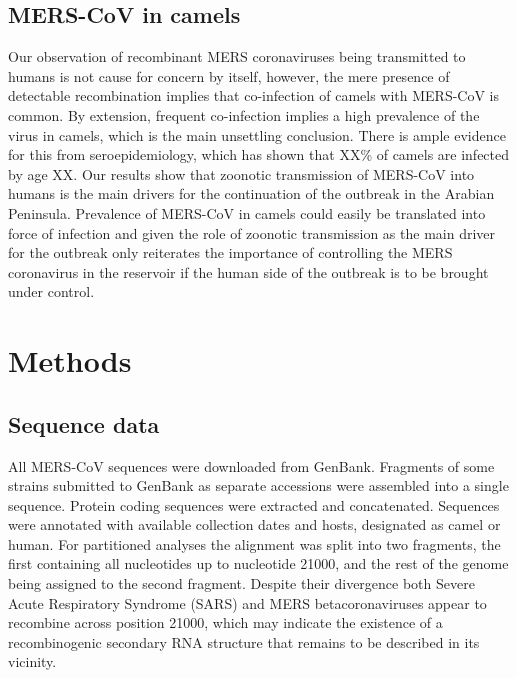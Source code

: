 \documentclass[11pt,oneside,letterpaper]{article}
\begin{document}
\subsection*{MERS-CoV in camels}
Our observation of recombinant MERS coronaviruses being transmitted to humans is not cause for concern by itself, however, the mere presence of detectable recombination implies that co-infection of camels with MERS-CoV is common.
By extension, frequent co-infection implies a high prevalence of the virus in camels, which is the main unsettling conclusion.
There is ample evidence for this from seroepidemiology, which has shown that XX\% of camels are infected by age XX.
Our results show that zoonotic transmission of MERS-CoV into humans is the main drivers for the continuation of the outbreak in the Arabian Peninsula. 
Prevalence of MERS-CoV in camels could easily be translated into force of infection and given the role of zoonotic transmission as the main driver for the outbreak only reiterates the importance of controlling the MERS coronavirus in the reservoir if the human side of the outbreak is to be brought under control.



\newpage

\section*{Methods}
\subsection*{Sequence data}
All MERS-CoV sequences were downloaded from GenBank.
Fragments of some strains submitted to GenBank as separate accessions were assembled into a single sequence.
Protein coding sequences were extracted and concatenated.
Sequences were annotated with available collection dates and hosts, designated as camel or human.
For partitioned analyses the alignment was split into two fragments, the first containing all nucleotides up to nucleotide 21000, and the rest of the genome being assigned to the second fragment.
Despite their divergence both Severe Acute Respiratory Syndrome (SARS) and MERS betacoronaviruses appear to recombine across position 21000, which may indicate the existence of a recombinogenic secondary RNA structure that remains to be described in its vicinity. %
\end{document}
